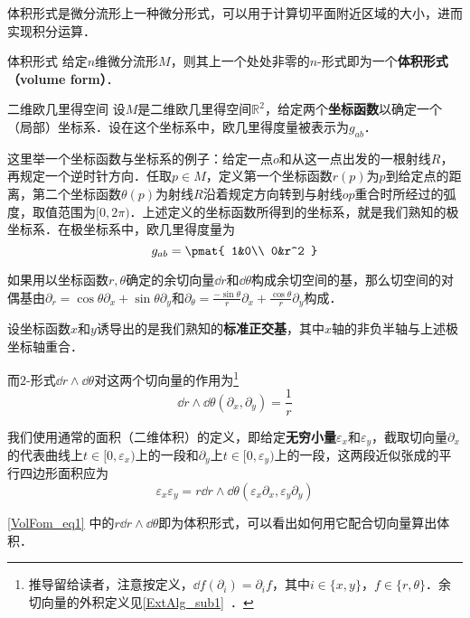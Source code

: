 



体积形式是微分流形上一种微分形式，可以用于计算切平面附近区域的大小，进而实现积分运算．

\begin{definition}{体积形式}
给定$n$维微分流形$M$，则其上一个处处非零的$n$-形式即为一个\textbf{体积形式（volume form）}．
\end{definition}

\begin{example}{二维欧几里得空间}\label{VolFom_ex1}
设$M$是二维欧几里得空间$\mathbb{R}^2$，给定两个\textbf{坐标函数}以确定一个（局部）坐标系．设在这个坐标系中，欧几里得度量被表示为$g_{ab}$．

这里举一个坐标函数与坐标系的例子：给定一点$o$和从这一点出发的一根射线$R$，再规定一个逆时针方向．任取$p\in M$，定义第一个坐标函数$r(p)$为$p$到给定点的距离，第二个坐标函数$\theta(p)$为射线$R$沿着规定方向转到与射线$op$重合时所经过的弧度，取值范围为$[0, 2\pi)$．上述定义的坐标函数所得到的坐标系，就是我们熟知的极坐标系．在极坐标系中，欧几里得度量为
\begin{equation}
g_{ab}=\pmat{
    1&0\\
    0&r^2
}
\end{equation}


如果用以坐标函数$r, \theta$确定的余切向量$\dd r$和$\dd \theta$构成余切空间的基，那么切空间的对偶基由$\partial_r=\cos\theta\partial_x+\sin\theta\partial_y$和$\partial_\theta=\frac{-\sin\theta}{r}\partial_x+\frac{\cos\theta}{r}\partial_y$构成．



设坐标函数$x$和$y$诱导出的是我们熟知的\textbf{标准正交基}，其中$x$轴的非负半轴与上述极坐标轴重合．





而$2$-形式$\dd r\wedge\dd \theta$对这两个切向量的作用为\footnote{推导留给读者，注意按定义，$\dd f(\partial_i)=\partial_i f$，其中$i\in\{x, y\}$，$f\in\{r, \theta\}$．余切向量的外积定义见\autoref{ExtAlg_sub1}~．}
\begin{equation}
\dd r\wedge\dd \theta(\partial_x, \partial_y) = \frac{1}{r}
\end{equation}

我们使用通常的面积（二维体积）的定义，即给定\textbf{无穷小量}$\varepsilon_x$和$\varepsilon_y$，截取切向量$\partial_x$的代表曲线上$t\in[0, \varepsilon_x)$上的一段和$\partial_y$上$t\in[0, \varepsilon_y)$上的一段，这两段近似张成的平行四边形面积应为
\begin{equation}\label{VolFom_eq1}
\varepsilon_x\varepsilon_y = r\dd r\wedge\dd \theta(\varepsilon_x\partial_x, \varepsilon_y\partial_y)
\end{equation}


\autoref{VolFom_eq1} 中的$r\dd r\wedge\dd \theta$即为体积形式，可以看出如何用它配合切向量算出体积．


\end{example}



